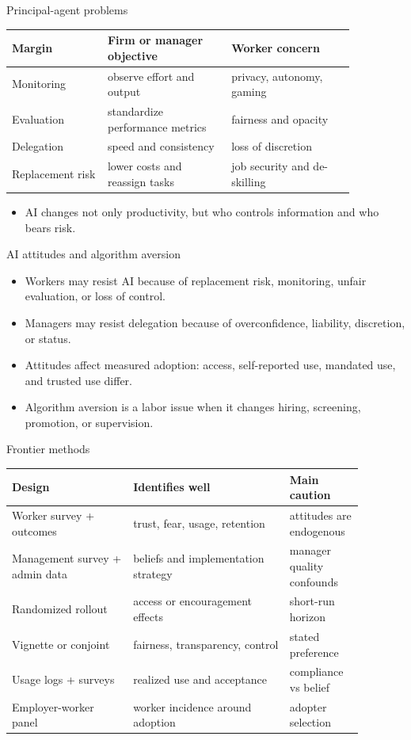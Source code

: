 \documentclass[aspectratio=169,11pt]{beamer}
\begin{document}
\begin{frame}{Principal-agent problems}
\small
\begin{tabular}{p{0.24\linewidth} p{0.31\linewidth} p{0.31\linewidth}}
\toprule
Margin & Firm or manager objective & Worker concern \\
\midrule
Monitoring & observe effort and output & privacy, autonomy, gaming \\
Evaluation & standardize performance metrics & fairness and opacity \\
Delegation & speed and consistency & loss of discretion \\
Replacement risk & lower costs and reassign tasks & job security and de-skilling \\
\bottomrule
\end{tabular}
\vspace{0.35cm}
\begin{itemize}
    \item AI changes not only productivity, but who controls information and who bears risk.
\end{itemize}
\end{frame}

\begin{frame}{AI attitudes and algorithm aversion}
\begin{itemize}
    \item Workers may resist AI because of replacement risk, monitoring, unfair evaluation, or loss of control.
    \item Managers may resist delegation because of overconfidence, liability, discretion, or status.
    \item Attitudes affect measured adoption: access, self-reported use, mandated use, and trusted use differ.
    \item Algorithm aversion is a labor issue when it changes hiring, screening, promotion, or supervision.
\end{itemize}
\end{frame}

\begin{frame}{Frontier methods}
\small
\begin{tabular}{p{0.31\linewidth} p{0.40\linewidth} p{0.17\linewidth}}
\toprule
Design & Identifies well & Main caution \\
\midrule
Worker survey + outcomes & trust, fear, usage, retention & attitudes are endogenous \\
Management survey + admin data & beliefs and implementation strategy & manager quality confounds \\
Randomized rollout & access or encouragement effects & short-run horizon \\
Vignette or conjoint & fairness, transparency, control & stated preference \\
Usage logs + surveys & realized use and acceptance & compliance vs belief \\
Employer-worker panel & worker incidence around adoption & adopter selection \\
\bottomrule
\end{tabular}
\end{frame}
\end{document}
